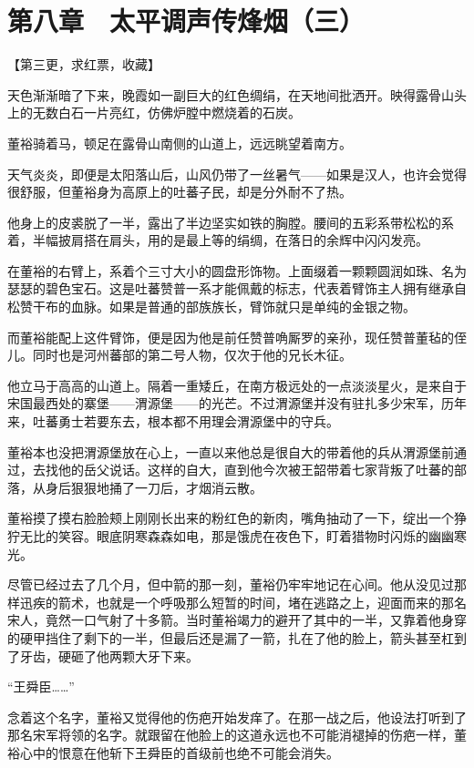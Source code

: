 \section{第八章　太平调声传烽烟（三）}

【第三更，求红票，收藏】

天色渐渐暗了下来，晚霞如一副巨大的红色绸绢，在天地间批洒开。映得露骨山头上的无数白石一片亮红，仿佛炉膛中燃烧着的石炭。

董裕骑着马，顿足在露骨山南侧的山道上，远远眺望着南方。

天气炎炎，即便是太阳落山后，山风仍带了一丝暑气——如果是汉人，也许会觉得很舒服，但董裕身为高原上的吐蕃子民，却是分外耐不了热。

他身上的皮裘脱了一半，露出了半边坚实如铁的胸膛。腰间的五彩系带松松的系着，半幅披肩搭在肩头，用的是最上等的绢绸，在落日的余辉中闪闪发亮。

在董裕的右臂上，系着个三寸大小的圆盘形饰物。上面缀着一颗颗圆润如珠、名为瑟瑟的碧色宝石。这是吐蕃赞普一系才能佩戴的标志，代表着臂饰主人拥有继承自松赞干布的血脉。如果是普通的部族族长，臂饰就只是单纯的金银之物。

而董裕能配上这件臂饰，便是因为他是前任赞普唃厮罗的亲孙，现任赞普董毡的侄儿。同时也是河州蕃部的第二号人物，仅次于他的兄长木征。

他立马于高高的山道上。隔着一重矮丘，在南方极远处的一点淡淡星火，是来自于宋国最西处的寨堡——渭源堡——的光芒。不过渭源堡并没有驻扎多少宋军，历年来，吐蕃勇士若要东去，根本都不用理会渭源堡中的守兵。

董裕本也没把渭源堡放在心上，一直以来他总是很自大的带着他的兵从渭源堡前通过，去找他的岳父说话。这样的自大，直到他今次被王韶带着七家背叛了吐蕃的部落，从身后狠狠地捅了一刀后，才烟消云散。

董裕摸了摸右脸脸颊上刚刚长出来的粉红色的新肉，嘴角抽动了一下，绽出一个狰狞无比的笑容。眼底阴寒森森如电，那是饿虎在夜色下，盯着猎物时闪烁的幽幽寒光。

尽管已经过去了几个月，但中箭的那一刻，董裕仍牢牢地记在心间。他从没见过那样迅疾的箭术，也就是一个呼吸那么短暂的时间，堵在逃路之上，迎面而来的那名宋人，竟然一口气射了十多箭。当时董裕竭力的避开了其中的一半，又靠着他身穿的硬甲挡住了剩下的一半，但最后还是漏了一箭，扎在了他的脸上，箭头甚至杠到了牙齿，硬砸了他两颗大牙下来。

“王舜臣……”

念着这个名字，董裕又觉得他的伤疤开始发痒了。在那一战之后，他设法打听到了那名宋军将领的名字。就跟留在他脸上的这道永远也不可能消褪掉的伤疤一样，董裕心中的恨意在他斩下王舜臣的首级前也绝不可能会消失。

